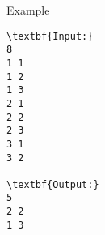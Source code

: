 Example
\begin{verbatim}
\textbf{Input:}
8
1 1
1 2
1 3
2 1
2 2
2 3
3 1
3 2

\textbf{Output:}
5
2 2
1 3

\end{verbatim}